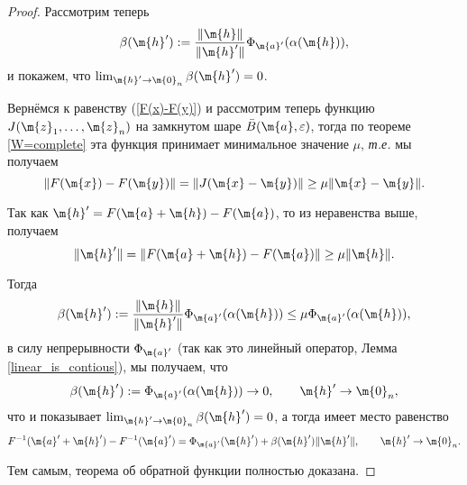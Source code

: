 \begin{proof}
Рассмотрим теперь 
\[
 \beta(\m{h}'): = \frac{\|\m{h}\|}{\| \m{h}'\|}\Phi_{\m{a}'}(\alpha(\m{h})) ,
\]
и покажем, что $\lim_{\m{h}' \to \m{0}_n} \beta(\m{h}') = 0$.

Вернёмся к равенству (\ref{F(x)-F(y)}) и рассмотрим теперь функцию $J(\m{z}_1,\ldots, \m{z}_n)$ на замкнутом шаре $\bar B(\m{a},\varepsilon)$, тогда по теореме \ref{W=complete} эта функция принимает минимальное значение $\mu$, \textit{т.е.} мы получаем
\[
 \| F(\m{x}) - F(\m{y})\| = \| J(\m{x}-\m{y})\| \ge \mu \|\m{x} - \m{y}\|.
\]

Так как $\m{h}'= F(\m{a} + \m{h}) - F(\m{a})$, то из неравенства выше, получаем
\[
  \| \m{h}'\| =\| F(\m{a} + \m{h}) - F(\m{a}) \| \ge  \mu \| \m{h} \|.
\]

Тогда
\[
 \beta(\m{h}'): = \frac{\|\m{h}\|}{\| \m{h}'\|}\Phi_{\m{a}'}(\alpha(\m{h})) \le \mu \Phi_{\m{a}'}(\alpha(\m{h})),
\]
в силу непрерывности $\Phi_{\m{a}'}$ (так как это линейный оператор, Лемма \ref{linear_is_contious}), мы получаем, что 
\[
 \beta(\m{h}'): = \Phi_{\m{a}'}(\alpha(\m{h})) \to 0, \qquad \m{h}' \to \m{0}_n,
\]
что и показывает $\lim_{\m{h}' \to \m{0}_n} \beta(\m{h}') = 0$, а тогда имеет место равенство 
\[
 F^{-1}(\m{a}' + \m{h}') - F^{-1}(\m{a}') = \Phi_{\m{a}'}(\m{h}') + \beta(\m{h}') \| \m{h}'\|, \qquad \m{h}' \to \m{0}_n.
\]

Тем самым, теорема об обратной функции полностью доказана.
\end{proof}
